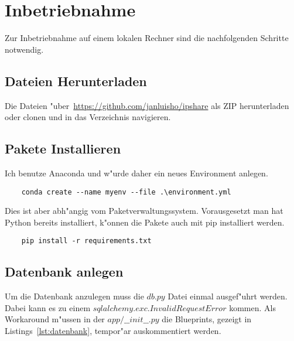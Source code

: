 
\chapter{Inbetriebnahme}\label{ch:inbetriebnahme}
Zur Inbetriebnahme auf einem lokalen Rechner sind die nachfolgenden Schritte notwendig.

\section{Dateien Herunterladen}\label{sec:dateien-herunterladen}
Die Dateien {"u}ber~\url{https://github.com/janluisho/ipshare} als ZIP herunterladen oder clonen und in das Verzeichnis navigieren.

\section{Pakete Installieren}\label{sec:parkete-installieren}
Ich benutze Anaconda und w{"u}rde daher ein neues Environment anlegen.

\vspace{3mm}
\begin{lstlisting}
    conda create --name myenv --file .\environment.yml
\end{lstlisting}
\vspace{3mm}

Dies ist aber abh{"a}ngig vom Paketverwaltungssystem.
Vorausgesetzt man hat Python bereits installiert, k{"o}nnen die Pakete auch mit pip installiert werden.

\vspace{3mm}
\begin{lstlisting}
    pip install -r requirements.txt
\end{lstlisting}
\vspace{3mm}

\section{Datenbank anlegen}\label{sec:datenbank-anlegen}
Um die Datenbank anzulegen muss die $db.py$ Datei einmal ausgef{"u}hrt werden.
Dabei kann es zu einem $sqlalchemy.exc.InvalidRequestError$ kommen.
Als Workaround m{"u}ssen in der $app/\_\_init\_\_.py$ die Blueprints, gezeigt in Listings~\ref{lst:datenbank}, tempor{"a}r auskommentiert werden.


